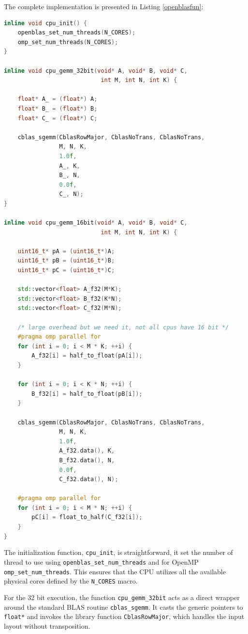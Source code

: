 The complete implementation is presented in Listing \ref{openblasfun}:

\begin{lstlisting}[caption={OpenBLAS CPU Implementation}, language=C++, label={openblasfun}] 
inline void cpu_init() {
    openblas_set_num_threads(N_CORES);
    omp_set_num_threads(N_CORES);
}

inline void cpu_gemm_32bit(void* A, void* B, void* C, 
                            int M, int N, int K) {

    float* A_ = (float*) A;
    float* B_ = (float*) B;
    float* C_ = (float*) C;

    cblas_sgemm(CblasRowMajor, CblasNoTrans, CblasNoTrans,
                M, N, K,
                1.0f,
                A_, K,
                B_, N,
                0.0f,
                C_, N);
}

inline void cpu_gemm_16bit(void* A, void* B, void* C, 
                            int M, int N, int K) {

    uint16_t* pA = (uint16_t*)A;
    uint16_t* pB = (uint16_t*)B;
    uint16_t* pC = (uint16_t*)C;

    std::vector<float> A_f32(M*K);
    std::vector<float> B_f32(K*N);
    std::vector<float> C_f32(M*N);

    /* large overhead but we need it, not all cpus have 16 bit */
    #pragma omp parallel for
    for (int i = 0; i < M * K; ++i) {
        A_f32[i] = half_to_float(pA[i]);
    }

    for (int i = 0; i < K * N; ++i) {
        B_f32[i] = half_to_float(pB[i]);
    }

    cblas_sgemm(CblasRowMajor, CblasNoTrans, CblasNoTrans,
                M, N, K,
                1.0f,
                A_f32.data(), K,
                B_f32.data(), N,
                0.0f,
                C_f32.data(), N);

    #pragma omp parallel for
    for (int i = 0; i < M * N; ++i) {
        pC[i] = float_to_half(C_f32[i]);
    }
}
\end{lstlisting}

The initialization function, \texttt{cpu\_init}, is straightforward, it set the number of thread to use using \texttt{openblas\_set\_num\_threads} and for OpenMP \texttt{omp\_set\_num\_threads}. This ensures that the CPU utilizes all the available physical cores defined by the \texttt{N\_CORES} macro.

For the 32 bit execution, the function \texttt{cpu\_gemm\_32bit} acts as a direct wrapper around the standard BLAS routine \texttt{cblas\_sgemm}. It casts the generic pointers to \texttt{float*} and invokes the library function \texttt{CblasRowMajor}, which handles the input layout without transposition.

